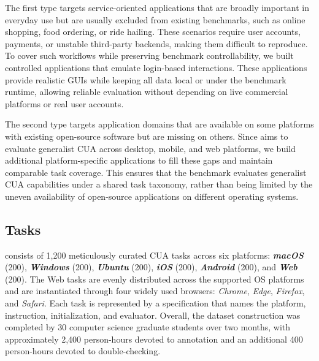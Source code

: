The first type targets service-oriented applications that are broadly important in everyday use but are usually excluded from existing benchmarks, such as online shopping, food ordering, or ride hailing. These scenarios require user accounts, payments, or unstable third-party backends, making them difficult to reproduce. To cover such workflows while preserving benchmark controllability, we built controlled applications that emulate login-based interactions. These applications provide realistic GUIs while keeping all data local or under the benchmark runtime, allowing reliable evaluation without depending on live commercial platforms or real user accounts.

The second type targets application domains that are available on some platforms with existing open-source software but are missing on others. Since \dataset aims to evaluate generalist CUA across desktop, mobile, and web platforms, we build additional platform-specific applications to fill these gaps and maintain comparable task coverage. This ensures that the benchmark evaluates generalist CUA capabilities under a shared task taxonomy, rather than being limited by the uneven availability of open-source applications on different operating systems.

\subsection{Tasks}
\vspace{-5pt}
\dataset consists of 1,200 meticulously curated CUA tasks across six platforms: \textbf{\textit{macOS}} (200), \textbf{\textit{Windows}} (200), \textbf{\textit{Ubuntu}} (200), \textbf{\textit{iOS}} (200), \textbf{\textit{Android}} (200), and \textbf{\textit{Web}} (200). The Web tasks are evenly distributed across the supported OS platforms and are instantiated through four widely used browsers: \textit{Chrome}, \textit{Edge}, \textit{Firefox}, and \textit{Safari}. Each task is represented by a specification that names the platform, instruction, initialization, and evaluator. Overall, the dataset construction was completed by 30 computer science graduate students over two months, with approximately 2,400 person-hours devoted to annotation and an additional 400 person-hours devoted to double-checking.


